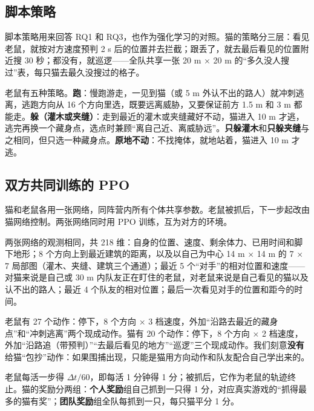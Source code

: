 \documentclass[a4paper,zihao=5,fontset=fandol,UTF8]{ctexart}
\begin{document}
\subsection{脚本策略}
\label{sec:script}
脚本策略用来回答 RQ1 和 RQ3，也作为强化学习的对照。猫的策略分三层：看见老鼠，就按对方速度预判 2 s 后的位置并去拦截；跟丢了，就去最后看见的位置附近搜 30 秒；都没有，就巡逻——全队共享一张 20 m × 20 m 的“多久没人搜过”表，每只猫去最久没搜过的格子。

老鼠有五种策略。\textbf{跑}：慢跑游走，一见到猫（或 5 m 外认不出的路人）就冲刺逃离，逃跑方向从 16 个方向里选，既要远离威胁，又要保证前方 1.5 m 和 3 m 都能走。\textbf{躲（灌木或夹缝）}：走到最近的灌木或夹缝藏好不动，猫进入 10 m 才逃，逃完再换一个藏身点，选点时兼顾“离自己近、离威胁远”。\textbf{只躲灌木}和\textbf{只躲夹缝}与之相同，但只选一种藏身点。\textbf{原地不动}：不找掩体，就地站着，猫进入 10 m 才逃。

\subsection{双方共同训练的 PPO}
\label{sec:obs}
猫和老鼠各用一张网络，同阵营内所有个体共享参数。老鼠被抓后，下一步起改由猫网络控制。两张网络同时用 PPO\cite{schulman2017ppo} 训练，互为对方的环境。

两张网络的观测相同，共 218 维：自身的位置、速度、剩余体力、已用时间和脚下地形；8 个方向上到最近建筑的距离，以及以自己为中心 14 m × 14 m 的 7 × 7 局部图（灌木、夹缝、建筑三个通道）；最近 5 个“对手”的相对位置和速度——对猫来说是自己或 30 m 内队友正在盯住的老鼠，对老鼠来说是自己看见的猫以及认不出的路人；最近 4 个队友的相对位置；最后一次看见对手的位置和距今的时间。

老鼠有 27 个动作：停下，8 个方向 × 3 档速度，外加“沿路去最近的藏身点”和“冲刺逃离”两个现成动作。猫有 20 个动作：停下，8 个方向 × 2 档速度，外加“沿路追（带预判）”“去最后看见的地方”“巡逻”三个现成动作。我们刻意\textbf{没有}给猫“包抄”动作：如果围捕出现，只能是猫用方向动作和队友配合自己学出来的。

老鼠每活一步得 $\Delta t/60$，即每活 1 分钟得 1 分；被抓后，它作为老鼠的轨迹终止。猫的奖励分两组：\textbf{个人奖励}组自己抓到一只得 1 分，对应真实游戏的“抓得最多的猫有奖”；\textbf{团队奖励}组全队每抓到一只，每只猫平分 1 分。
\end{document}

